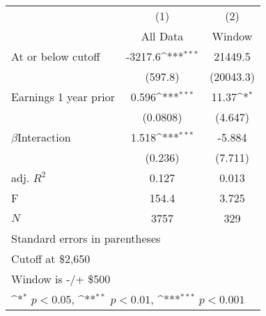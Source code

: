 {
\def\sym#1{\ifmmode^{#1}\else\(^{#1}\)\fi}
\begin{tabular}{l*{2}{c}}
\hline\hline
            &\multicolumn{1}{c}{(1)}&\multicolumn{1}{c}{(2)}\\
            &\multicolumn{1}{c}{All Data}&\multicolumn{1}{c}{Window}\\
\hline
At or below cutoff&     -3217.6\sym{***}&     21449.5         \\
            &     (597.8)         &   (20043.3)         \\
[1em]
Earnings 1 year prior&       0.596\sym{***}&       11.37\sym{*}  \\
            &    (0.0808)         &     (4.647)         \\
[1em]
$\beta$Interaction&       1.518\sym{***}&      -5.884         \\
            &     (0.236)         &     (7.711)         \\
\hline
adj. \(R^{2}\)&       0.127         &       0.013         \\
F           &       154.4         &       3.725         \\
\(N\)       &        3757         &         329         \\
\hline\hline
\multicolumn{3}{l}{\footnotesize Standard errors in parentheses}\\
\multicolumn{3}{l}{\footnotesize Cutoff at \$2,650}\\
\multicolumn{3}{l}{\footnotesize Window is -/+ \$500}\\
\multicolumn{3}{l}{\footnotesize \sym{*} \(p<0.05\), \sym{**} \(p<0.01\), \sym{***} \(p<0.001\)}\\
\end{tabular}
}
